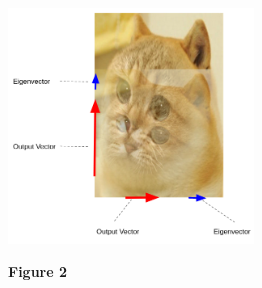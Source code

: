 \documentclass{article}
\begin{document}
\begin{minipage}[c]{.5\linewidth}
	\begin{center}
		\includegraphics[width=6.5cm]{eigen-cate-scaled.png}	
	\end{center}
	\begin{center}
		\textbf{Figure 2}
	\end{center}

\end{minipage}
\newpage
\end{document}
